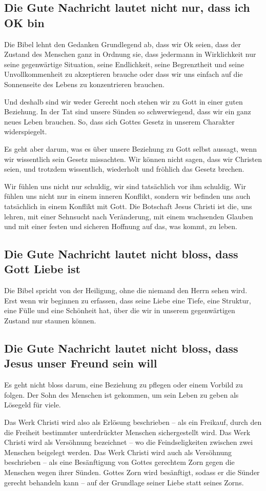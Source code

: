 \documentclass{../../inc/mybib}
\begin{document}
\subsection{Die Gute Nachricht lautet nicht nur, dass ich OK bin}
Die Bibel lehnt den Gedanken Grundlegend ab, dass wir Ok seien, dass der Zustand des Menschen ganz in Ordnung sie, dass jedermann in Wirklichkeit nur seine gegenwärtige Situation, seine Endlichkeit, seine Begrenztheit und seine Unvollkommenheit zu akzeptieren brauche oder dass wir uns einfach auf die Sonnenseite des Lebens zu konzentrieren brauchen.

Und deshalb sind wir weder Gerecht noch stehen wir zu Gott in einer guten Beziehung. In der Tat sind unsere Sünden so schwerwiegend, dass wir ein ganz neues Leben brauchen.
So, dass sich Gottes Gesetz in unserem Charakter widerspiegelt.

Es geht aber darum, was es über unsere Beziehung zu Gott selbst aussagt, wenn wir wissentlich sein Gesetz missachten. Wir können nicht sagen, dass wir Christen seien, und trotzdem wissentlich, wiederholt und fröhlich das Gesetz brechen.

Wir fühlen uns nicht nur schuldig, wir sind tatsächlich vor ihm schuldig. Wir fühlen uns nicht nur in einem inneren Konflikt, sondern wir befinden uns auch tatsächlich in einem Konflikt mit Gott. Die Botschaft Jesus Christi ist die, uns lehren, mit einer Sehnsucht nach Veränderung, mit einem wachsenden Glauben und mit einer festen und sicheren Hoffnung auf das, was kommt, zu leben.
\subsection{Die Gute Nachricht lautet nicht bloss, dass Gott Liebe ist}
Die Bibel spricht von der Heiligung, ohne die niemand den Herrn sehen wird. Erst wenn wir beginnen zu erfassen, dass seine Liebe eine Tiefe, eine Struktur, eine Fülle und eine Schönheit hat, über die wir in unserem gegenwärtigen Zustand nur staunen können.
\subsection{Die Gute Nachricht lautet nicht bloss, dass Jesus unser Freund sein will}
Es geht nicht bloss darum, eine Beziehung zu pflegen oder einem Vorbild zu folgen. Der Sohn des Menschen ist gekommen, um sein Leben zu geben als Lösegeld für viele.

Das Werk Christi wird also als Erlösung beschrieben -- als ein Freikauf, durch den die Freiheit bestimmter unterdrückter Menschen sichergestellt wird. Das Werk Christi wird als Versöhnung bezeichnet -- wo die Feindseligkeiten zwischen zwei Menschen beigelegt werden. Das Werk Christi wird auch als Versöhnung beschrieben -- als eine Besänftigung von Gottes gerechtem Zorn gegen die Menschen wegen ihrer Sünden. Gottes Zorn wird besänftigt, sodass er die Sünder gerecht behandeln kann -- auf der Grundlage seiner Liebe statt seines Zorns.
\end{document}
